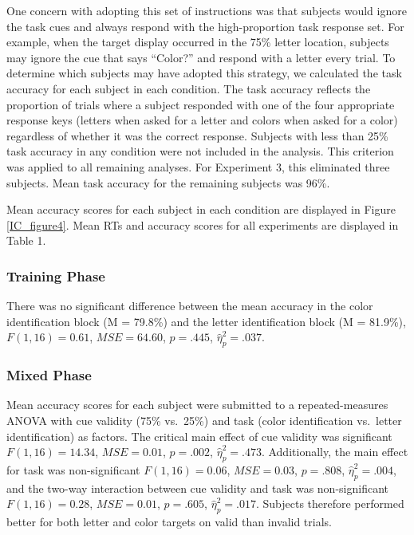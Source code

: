 \documentclass[]{DissertateCUNY}
\begin{document}
One concern with adopting this set of instructions was that subjects
would ignore the task cues and always respond with the high-proportion
task response set. For example, when the target display occurred in the
75\% letter location, subjects may ignore the cue that says ``Color?''
and respond with a letter every trial. To determine which subjects may
have adopted this strategy, we calculated the task accuracy for each
subject in each condition. The task accuracy reflects the proportion of
trials where a subject responded with one of the four appropriate
response keys (letters when asked for a letter and colors when asked for
a color) regardless of whether it was the correct response. Subjects
with less than 25\% task accuracy in any condition were not included in
the analysis. This criterion was applied to all remaining analyses. For
Experiment 3, this eliminated three subjects. Mean task accuracy for the
remaining subjects was 96\%.

Mean accuracy scores for each subject in each condition are displayed in
Figure \ref{IC_figure4}. Mean RTs and accuracy scores for all
experiments are displayed in Table 1.

\hypertarget{training-phase}{%
\subsubsection{Training Phase}\label{training-phase}}

There was no significant difference between the mean accuracy in the
color identification block (M = 79.8\%) and the letter identification
block (M = 81.9\%), \(F(1, 16) = 0.61\), \(\mathit{MSE} = 64.60\),
\(p = .445\), \(\hat{\eta}^2_p = .037\).

\hypertarget{mixed-phase}{%
\subsubsection{Mixed Phase}\label{mixed-phase}}

Mean accuracy scores for each subject were submitted to a
repeated-measures ANOVA with cue validity (75\% vs.~25\%) and task
(color identification vs.~letter identification) as factors. The
critical main effect of cue validity was significant
\(F(1, 16) = 14.34\), \(\mathit{MSE} = 0.01\), \(p = .002\),
\(\hat{\eta}^2_p = .473\). Additionally, the main effect for task was
non-significant \(F(1, 16) = 0.06\), \(\mathit{MSE} = 0.03\),
\(p = .808\), \(\hat{\eta}^2_p = .004\), and the two-way interaction
between cue validity and task was non-significant \(F(1, 16) = 0.28\),
\(\mathit{MSE} = 0.01\), \(p = .605\), \(\hat{\eta}^2_p = .017\).
Subjects therefore performed better for both letter and color targets on
valid than invalid trials.
\end{document}
